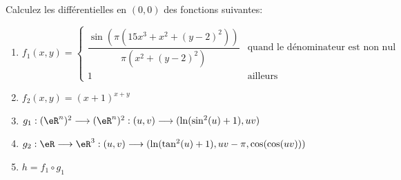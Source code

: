 
\begin{exercice}\label{exo0051}


	Calculez les différentielles en  $(0,0)$ des fonctions suivantes:

	\begin{enumerate}
		\item $f_1(x,y)=\left\{\begin{array}{cl}
				      \dfrac{\sin(\pi(15x^3+x^2+(y-2)^2))}{\pi(x^2+(y-2)^2)} & \text{quand le dénominateur est non nul} \\
				      1                                                      & \text{ailleurs}
			      \end{array}\right.$
		\item $f_2(x,y)= (x+1)^{x+y}$
		\item $g_1:(\eR^n)^2\longrightarrow(\eR^n)^2:(u,v)\longrightarrow(\ln(\sin^2(u)+1),uv)$
		\item $g_2:\eR\longrightarrow\eR^3:(u,v)\longrightarrow(\ln(\tan^2(u)+1),uv-\pi, \cos(\cos(uv)))$
		\item $h=f_1\circ g_1$
	\end{enumerate}

\end{exercice}
